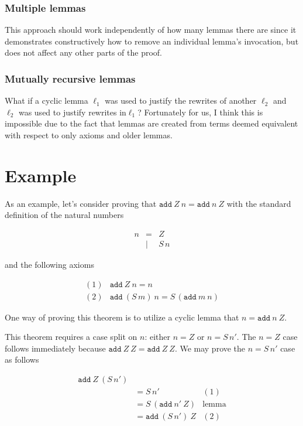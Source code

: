 \documentclass{article}[11pt]
\newcommand{\add}[2]{\texttt{add}\ #1 \ #2}
\newcommand{\next}[1]{S \, #1}
\begin{document}
\subsubsection{Multiple lemmas}

This approach should work independently of how many lemmas there are since it
demonstrates constructively how to remove an individual lemma's invocation, but
does not affect any other parts of the proof.

\subsubsection{Mutually recursive lemmas}

What if a cyclic lemma \(\ell_{1}\) was used to justify the rewrites of another
\(\ell_{2}\) and \(\ell_{2}\) was used to justify rewrites in\(\ell_{1}\)?
Fortunately for us, I think this is impossible due to the fact that lemmas are
created from terms deemed equivalent with respect to only axioms and older
lemmas.

\section{Example}

As an example, let's consider proving that \(\add Z n = \add n Z\) with the standard
definition of the natural numbers

\[
\begin{array}{lcl}
  n &= & Z \\
    &| & \next n
\end{array}
\]

and the following axioms

\[
\begin{array}{ll}
  (1) & \add Z n = n \\
  (2) & \add {(\next m)} n = \next (\add m n)
\end{array}
\]

One way of proving this theorem is to utilize a cyclic lemma that \(n = \add n Z\).

This theorem requires a case split on \(n\): either \(n = Z\) or \(n = \next n'\). The
\(n = Z\) case follows immediately because \(\add Z Z = \add Z Z\). We may prove the
\(n = \next n'\) case as follows

\[
\begin{array}{lll}
  \add Z {(\next n')} & & \\
  &= \next n' & (1) \\
  &= \next (\add {n'} Z) & \text{lemma} \\
  &= \add {(\next n')} Z & (2) \\
\end{array}
\]
\end{document}
